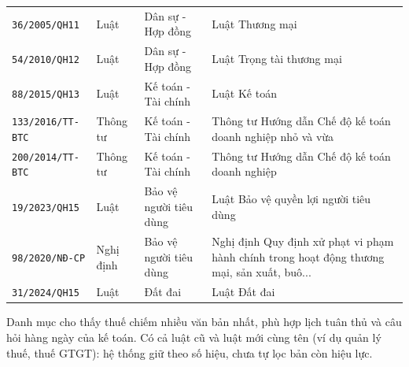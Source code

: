 \begin{longtable}{p{3.3cm}p{2.0cm}p{2.6cm}p{5.6cm}}
\texttt{36/2005/QH11} & Luật & Dân sự - Hợp đồng & Luật Thương mại \\
\texttt{54/2010/QH12} & Luật & Dân sự - Hợp đồng & Luật Trọng tài thương mại \\
\texttt{88/2015/QH13} & Luật & Kế toán - Tài chính & Luật Kế toán \\
\texttt{133/2016/TT-BTC} & Thông tư & Kế toán - Tài chính & Thông tư Hướng dẫn Chế độ kế toán doanh nghiệp nhỏ và vừa \\
\texttt{200/2014/TT-BTC} & Thông tư & Kế toán - Tài chính & Thông tư Hướng dẫn Chế độ kế toán doanh nghiệp \\
\texttt{19/2023/QH15} & Luật & Bảo vệ người tiêu dùng & Luật Bảo vệ quyền lợi người tiêu dùng \\
\texttt{98/2020/NĐ-CP} & Nghị định & Bảo vệ người tiêu dùng & Nghị định Quy định xử phạt vi phạm hành chính trong hoạt động thương mại, sản xuất, buô... \\
\texttt{31/2024/QH15} & Luật & Đất đai & Luật Đất đai \\
\bottomrule
\end{longtable}

Danh mục cho thấy thuế chiếm nhiều văn bản nhất, phù hợp lịch tuân thủ và câu
hỏi hàng ngày của kế toán. Có cả luật cũ và luật mới cùng tên (ví dụ quản lý
thuế, thuế GTGT): hệ thống giữ theo số hiệu, chưa tự lọc bản còn hiệu lực.
